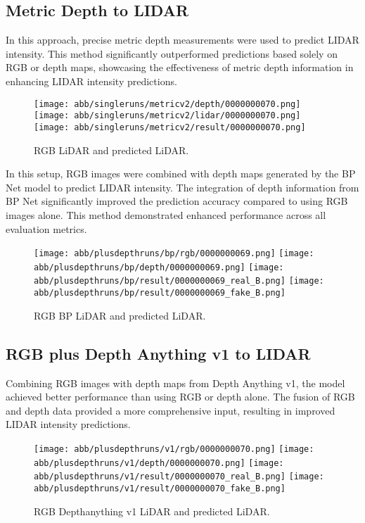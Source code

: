 \subsection{Metric Depth to LIDAR}

In this approach, precise metric depth measurements were used to predict LIDAR intensity. This method significantly outperformed predictions based solely on RGB or depth maps, showcasing the effectiveness of metric depth information in enhancing LIDAR intensity predictions.
\begin{figure}[!ht]
	\centering
	\texttt{[image: abb/singleruns/metricv2/depth/0000000070.png]}
	\texttt{[image: abb/singleruns/metricv2/lidar/0000000070.png]}
	\texttt{[image: abb/singleruns/metricv2/result/0000000070.png]}
	\caption{RGB LiDAR and predicted LiDAR.}
	\label{depth}
\end{figure}


In this setup, RGB images were combined with depth maps generated by the BP Net model to predict LIDAR intensity. The integration of depth information from BP Net significantly improved the prediction accuracy compared to using RGB images alone. This method demonstrated enhanced performance across all evaluation metrics.
\begin{figure}[!ht]
	\centering
	\texttt{[image: abb/plusdepthruns/bp/rgb/0000000069.png]}
	\texttt{[image: abb/plusdepthruns/bp/depth/0000000069.png]}
	\texttt{[image: abb/plusdepthruns/bp/result/0000000069\_real\_B.png]}
	\texttt{[image: abb/plusdepthruns/bp/result/0000000069\_fake\_B.png]}
	\caption{RGB BP LiDAR and predicted LiDAR.}
	\label{bpplusdepth}
\end{figure}
\subsection{RGB plus Depth Anything v1 to LIDAR}

Combining RGB images with depth maps from Depth Anything v1, the model achieved better performance than using RGB or depth alone. The fusion of RGB and depth data provided a more comprehensive input, resulting in improved LIDAR intensity predictions.
\begin{figure}[!ht]
	\centering
	\texttt{[image: abb/plusdepthruns/v1/rgb/0000000070.png]}
	\texttt{[image: abb/plusdepthruns/v1/depth/0000000070.png]}
	\texttt{[image: abb/plusdepthruns/v1/result/0000000070\_real\_B.png]}
	\texttt{[image: abb/plusdepthruns/v1/result/0000000070\_fake\_B.png]}
	\caption{RGB Depthanything v1 LiDAR and predicted LiDAR.}
	\label{bpplusdepth}
\end{figure}

